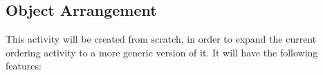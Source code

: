 \documentclass[preprint,12pt]{elsarticle}
\begin{document}










\subsection{Object Arrangement}

This activity will be created from scratch, in order to expand the current ordering activity to a more generic version of it. It will have the following features:
\end{document}
